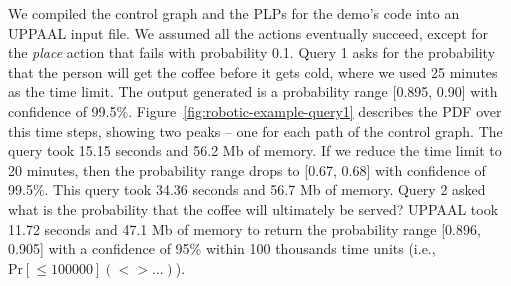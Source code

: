 \documentclass[letterpaper]{article}
\begin{document}



We compiled the control graph and the PLPs for the demo's code into an UPPAAL input file. 
We assumed all the actions eventually succeed, except for the {\em place} action that fails with probability 0.1.
Query 1 asks for the probability that the person will get the coffee before it gets cold, where we used 25 minutes as the time limit. %
The output generated is a probability range [0.895, 0.90] with confidence of 99.5\%.  Figure~\ref{fig:robotic-example-query1} describes the PDF over this time steps, showing two peaks -- one for each path of the control graph.
The query took 15.15 seconds and 56.2 Mb of memory.
If we reduce the time limit to 20 minutes, then the probability range drops to [0.67, 0.68] with confidence of 99.5\%.
This query took 34.36 seconds and 56.7 Mb of memory.
Query 2 asked what is the probability that the coffee will ultimately be served? %
UPPAAL took 11.72 seconds and 47.1 Mb of memory to return the probability range [0.896, 0.905] with a confidence of 95\% within 100 thousands time units (i.e., $\mathrm{Pr[\leq 100000] (<> ...)}$). 
\end{document}
